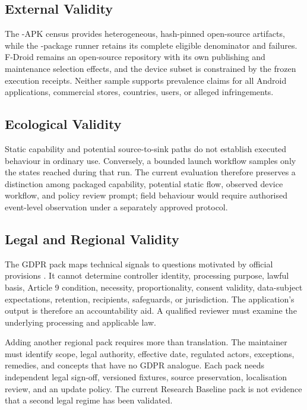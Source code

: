 \subsection{External Validity}

The \FDroidCensusN{}-APK census provides heterogeneous, hash-pinned open-source artifacts, while the \DevicePackagesN{}-package runner retains its complete eligible denominator and failures. F-Droid remains an open-source repository with its own publishing and maintenance selection effects, and the device subset is constrained by the frozen execution receipts. Neither sample supports prevalence claims for all Android applications, commercial stores, countries, users, or alleged infringements.

\subsection{Ecological Validity}

Static capability and potential source-to-sink paths do not establish executed behaviour in ordinary use. Conversely, a bounded launch workflow samples only the states reached during that run. The current evaluation therefore preserves a distinction among packaged capability, potential static flow, observed device workflow, and policy review prompt; field behaviour would require authorised event-level observation under a separately approved protocol.

\subsection{Legal and Regional Validity}

The GDPR pack maps technical signals to questions motivated by official provisions \cite{gdpr2016}. It cannot determine controller identity, processing purpose, lawful basis, Article 9 condition, necessity, proportionality, consent validity, data-subject expectations, retention, recipients, safeguards, or jurisdiction. The application's output is therefore an accountability aid. A qualified reviewer must examine the underlying processing and applicable law.

Adding another regional pack requires more than translation. The maintainer must identify scope, legal authority, effective date, regulated actors, exceptions, remedies, and concepts that have no GDPR analogue. Each pack needs independent legal sign-off, versioned fixtures, source preservation, localisation review, and an update policy. The current Research Baseline pack is not evidence that a second legal regime has been validated.

